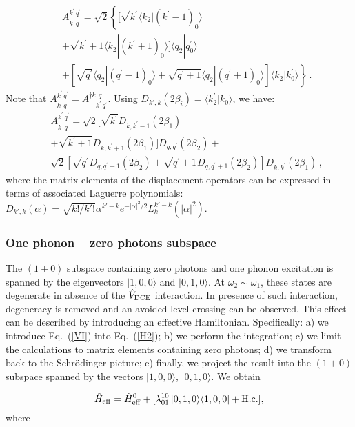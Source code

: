 \documentclass[aps,pra,twocolumn,floatfix,longbibliography, superscriptaddress]{revtex4-1}
\newcommand{\ket}[1]{|#1\rangle}
\newcommand{\braket}[2]{\langle #1|#2\rangle}
\newcommand{\ketbra}[2]{\left| #1 \rangle \langle #2 \right|}
\newcommand{\nn}{\nonumber}
\renewcommand{\eqref}[1]{\mbox{Eq.~(\ref{#1})}}
\newcommand{\be}{\begin{equation}}
\newcommand{\ee}{\end{equation}}
\newcommand{\bea}{\begin{eqnarray}}
\newcommand{\eea}{\end{eqnarray}}
\begin{document}
\bea
&&A^{k^\prime\,q^\prime}_{k^{\phantom{\prime}}\, q^{\phantom{\prime}}}= \nn
\sqrt{2}
\left\{ [\sqrt{k^\prime}\braket{k_2}{(k^\prime-1)_0}\right. \\ &&\left.+\sqrt{k^\prime +1}\braket{k_2}{(k^\prime+1)_0}]\braket{q_2}{q_0^\prime}\right. \\ &&\left.+ [\sqrt{q^\prime}\braket{q_2}{(q^\prime-1)_0}+\sqrt{q^\prime +1}\braket{q_2}{(q^\prime+1)_0}]\braket{k_2}{k_0^\prime} \nn
\right\}\, .
\eea
Note that 
$A^{k^\prime\,q^\prime}_{k^{\phantom{\prime}}\, q^{\phantom{\prime}}}=A_{\phantom{\dag}k^\prime\,q^\prime}^{\dag k^{\phantom{\prime}}\, q^{\phantom{\prime}}}$.
Using $D_{k',k}(2\beta_i)=\braket {k^\prime_2}{k_0}$, we have:
\bea
&&A^{k^\prime\,q^\prime}_{k^{\phantom{\prime}}\, q^{\phantom{\prime}}}= \nn
\sqrt{2}[\sqrt{k^\prime}D_{k,k^\prime-1}(2\beta_1) \\ &&+\sqrt{k^\prime +1}D_{k,k^{\prime}+1}(2\beta_1)]D_{q,q^{\prime}}(2\beta_2)+\\
&&\sqrt{2}[\sqrt{q^{\prime}}D_{q,q^\prime-1}(2\beta_2)+\sqrt{q^\prime +1}D_{q,q^\prime+1}(2\beta_2)]D_{k,k^\prime}(2\beta_1) \nn\, ,
\eea
where the matrix elements of the displacement operators can be expressed in terms of associated Laguerre polynomials: $D_{k',k}(\alpha)= \sqrt{k!/k'!} \alpha^{k'-k} e^{-|\alpha|^2/2} L_k^{k'-k}(|\alpha|^2)$.

\subsubsection{One phonon -- zero photons subspace}


The $(1+0)$ subspace containing zero photons and one phonon excitation is spanned by the eigenvectors $\ket{1,0,0}$ and  $\ket{0,1,0}$.
At $\omega_2\sim \omega_1$, these states are degenerate in absence of the $\hat V_{\rm DCE}$ interaction. In presence of such interaction, degeneracy is removed and an avoided level crossing can be observed. This effect can be described by introducing an effective Hamiltonian. Specifically:  a) we introduce \eqref{VI} into \eqref{H2}; b) we perform the integration; c) we limit the calculations to matrix elements containing zero photons; d) we transform back to the Schr\"{o}dinger picture; e) finally, we project the result into the $(1+0)$ subspace spanned by the vectors $\ket{1,0,0}$,  $\ket{0,1,0}$. We obtain

\be
\hat H_{\rm eff}=\hat H_{\rm eff}^0+[\lambda^{10}_{01} \ketbra{0,1,0}{1,0,0}
+ {\rm H.c.}],
\ee
where
\end{document}
